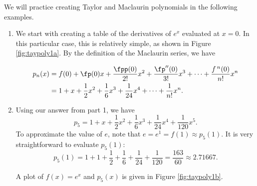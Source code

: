 We will practice creating Taylor and Maclaurin polynomials in the following examples.

{\begin{enumerate}
\item We start with creating a table of the derivatives of $e^x$ evaluated at $x=0$. In this particular case, this is relatively simple, as shown in Figure \ref{fig:taypoly1a}.
By the definition of the Maclaurin series, we have 

\begin{align*}
p_n(x) &= f(0) + \fp(0)x + \frac{\fpp(0)}{2!}x^2+\frac{\fp''(0)}{3!}x^3+\cdots+\frac{f\,^n(0)}{n!}x^n\\
			&= 1+x+\frac{1}{2}x^2+\frac{1}{6}x^3 + \frac{1}{24}x^4 + \cdots + \frac{1}{n!}x^n.
\end{align*}

\item	Using our answer from part 1, we have $$p_5 = 1+x+\frac{1}{2}x^2+\frac{1}{6}x^3 + \frac{1}{24}x^4 + \frac{1}{120}x^5.$$ To approximate the value of $e$, note that $e = e^1 = f(1) \approx p_5(1).$ It is very straightforward to evaluate $p_5(1)$:
$$p_5(1) = 1+1+\frac12+\frac16+\frac1{24}+\frac1{120} = \frac{163}{60} \approx 2.71667.$$

A plot of $f(x)=e^x$ and $p_5(x)$ is given in Figure \ref{fig:taypoly1b}.
\end{enumerate}}

